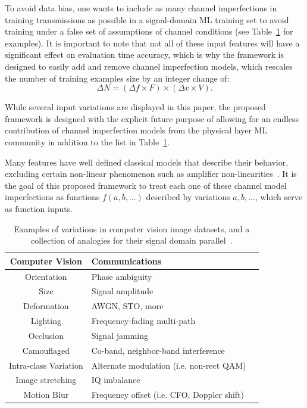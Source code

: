 To avoid data bias, one wants to include as many channel imperfections in training transmissions as possible in a signal-domain ML training set to avoid training under a false set of assumptions of channel conditions (see Table~\ref{tab:visionsignal} for examples). It is important to note that not all of these input features will have a significant effect on evaluation time accuracy, which is why the framework is designed to easily add and remove channel imperfection models, which rescales the number of training examples size by an integer change of:
\vspace{-1mm}
\begin{equation}
\Delta N = (\Delta f \times F) \times (\Delta v \times V).
\end{equation}

\noindent While several input variations are displayed in this paper, the proposed framework is designed with the explicit future purpose of allowing for an endless contribution of channel imperfection models from the physical layer ML community in addition to the list in Table~\ref{tab:visionsignal}.

Many features have well defined classical models that describe their behavior, excluding certain non-linear phenomenon such as amplifier non-linearities~\cite{wymeersch2007iterative}. It is the goal of this proposed framework to treat each one of these channel model imperfections as functions $f(a,b,...)$ described by variations $a,b,...$, which serve as function inputs.

\begin{table}[ht!]
\centering
\caption{Examples of variations in computer vision image datasets, and a collection of analogies for their signal domain parallel~\cite{cs231}.} 
\begin{tabular*}{1\textwidth}{c l c}
\toprule
Computer Vision & Communications \\\hline
Orientation & Phase ambiguity\\
Size & Signal amplitude\\
Deformation & AWGN, STO, more\\
Lighting & Frequency-fading multi-path\\
Occlusion & Signal jamming\\
Camouflaged & Co-band, neighbor-band interference\\
Intra-class Variation & Alternate modulation (i.e. non-rect QAM)\\
Image stretching & IQ imbalance\\
Motion Blur & Frequency offset (i.e. CFO, Doppler shift)\\
\bottomrule
\end{tabular*}
\label{tab:visionsignal}
\end{table}


